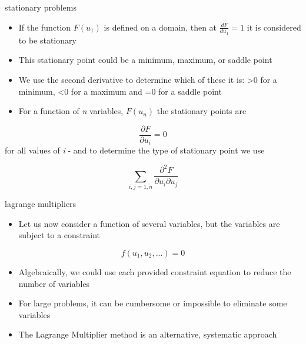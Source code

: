 \documentclass[12pt,handout]{beamer}
\providecommand{\tightlist}{%
  \setlength{\itemsep}{0pt}\setlength{\parskip}{0pt}}
\providecommand{\tightlist}{%
\setlength{\itemsep}{0pt}\setlength{\parskip}{0pt}}
\begin{document}
\begin{frame}{stationary problems}
\protect\hypertarget{stationary-problems}{}
\begin{itemize}
\tightlist
\item
  If the function \(F(u_1)\) is defined on a domain, then at
  \(\frac{dF}{du_1}=1\) it is considered to be stationary
\item
  This stationary point could be a minimum, maximum, or saddle point
\item
  We use the second derivative to determine which of these it is:
  \textgreater0 for a minimum, \textless0 for a maximum and =0 for a
  saddle point
\item
  For a function of \emph{n} variables, \(F(u_n)\) the stationary points
  are
\end{itemize}

\[\frac{\partial F}{\partial u_i} = 0\] for all values of \emph{i} - and
to determine the type of stationary point we use

\[\sum_{i,j=1,n} \frac {\partial^2 F}{\partial u_i \partial u_j}\]
\end{frame}

\begin{frame}{lagrange multipliers}
\protect\hypertarget{lagrange-multipliers-1}{}
\begin{itemize}
\tightlist
\item
  Let us now consider a function of several variables, but the variables
  are subject to a constraint
\end{itemize}

\[ f(u_1, u_2, ... ) = 0\]

\begin{itemize}
\tightlist
\item
  Algebraically, we could use each provided constraint equation to
  reduce the number of variables
\item
  For large problems, it can be cumbersome or impossible to eliminate
  some variables
\item
  The Lagrange Multiplier method is an alternative, systematic approach
\end{itemize}
\end{frame}
\end{document}
